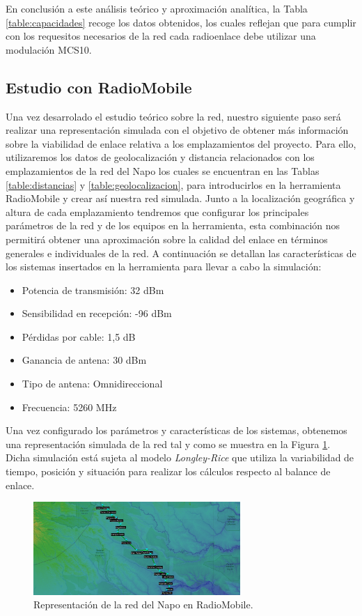 	En conclusión a este análisis teórico y aproximación analítica, la Tabla \ref{table:capacidades} recoge los datos obtenidos, los cuales reflejan que para cumplir con los requesitos necesarios de la red cada radioenlace debe utilizar una modulación MCS10.   
	
\subsection{Estudio con RadioMobile}
	Una vez desarrolado el estudio teórico sobre la red, nuestro siguiente paso será realizar una representación simulada con el objetivo de obtener más información sobre la viabilidad de enlace relativa a los emplazamientos del proyecto. Para ello, utilizaremos los datos de geolocalización y distancia relacionados con los emplazamientos de la red del Napo los cuales se encuentran en las Tablas \ref{table:distancias} y \ref{table:geolocalizacion}, para introducirlos en la herramienta RadioMobile y crear así nuestra red simulada. Junto a la localización geográfica y altura de cada emplazamiento tendremos que configurar los principales parámetros de la red y de los equipos en la herramienta, esta combinación nos permitirá obtener una aproximación sobre la calidad del enlace en términos generales e individuales de la red. A continuación se detallan las características de los sistemas insertados en la herramienta para llevar a cabo la simulación:
	\begin{itemize}
		\item Potencia de transmisión: 32 dBm
		\item Sensibilidad en recepción: -96 dBm
		\item Pérdidas por cable: 1,5 dB
		\item Ganancia de antena: 30 dBm
		\item Tipo de antena: Omnidireccional
		\item Frecuencia: 5260 MHz
	\end{itemize}
	Una vez configurado los parámetros y características de los sistemas, obtenemos una representación simulada de la red tal y como se muestra en la Figura \ref{redNapo}. Dicha simulación está sujeta al modelo \textit{Longley-Rice} que utiliza la variabilidad de tiempo, posición y situación para realizar los cálculos respecto al balance de enlace.  
	\begin{figure}[H]
		\centering
		\includegraphics[width=0.7\textwidth]{img/redNapo.PNG}
		\caption{Representación de la red del Napo en RadioMobile.}
		\label{redNapo}
	\end{figure}
